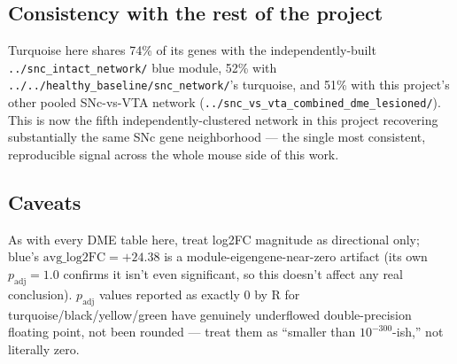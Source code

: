 \documentclass[11pt]{article}
\begin{document}
\subsection*{Consistency with the rest of the project}

Turquoise here shares 74\% of its genes with the independently-built
\texttt{../snc\_intact\_network/} blue module, 52\% with
\texttt{../../healthy\_baseline/snc\_network/}'s turquoise, and 51\% with this project's other
pooled SNc-vs-VTA network (\texttt{../snc\_vs\_vta\_combined\_dme\_lesioned/}). This is now the
fifth independently-clustered network in this project recovering substantially the same SNc
gene neighborhood --- the single most consistent, reproducible signal across the whole mouse
side of this work.

\subsection*{Caveats}

As with every DME table here, treat log2FC magnitude as directional only; blue's
$\mathrm{avg\_log2FC}=+24.38$ is a module-eigengene-near-zero artifact (its own
$p_{\mathrm{adj}}=1.0$ confirms it isn't even significant, so this doesn't affect any real
conclusion). $p_{\mathrm{adj}}$ values reported as exactly 0 by R for turquoise/black/yellow/green
have genuinely underflowed double-precision floating point, not been rounded --- treat them as
``smaller than $10^{-300}$-ish,'' not literally zero.
\end{document}

